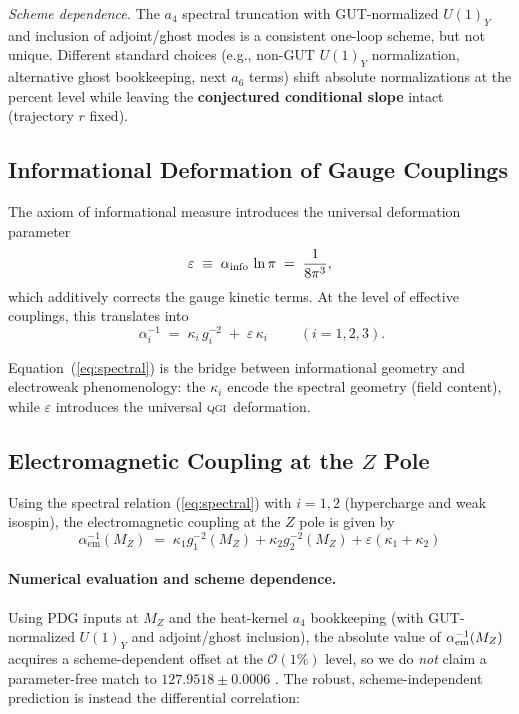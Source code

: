 \documentclass{article}
\numberwithin{equation}{section}
\theoremstyle{plain}
\theoremstyle{definition}
\theoremstyle{remark}
\newcommand{\qgi}{\textsc{qgi}}
\begin{document}
\emph{Scheme dependence.} The $a_4$ spectral truncation with GUT-normalized $U(1)_Y$ and inclusion of adjoint/ghost modes is a consistent one-loop scheme, but not unique. Different standard choices (e.g., non-GUT $U(1)_Y$ normalization, alternative ghost bookkeeping, next $a_6$ terms) shift absolute normalizations at the percent level while leaving the \textbf{conjectured conditional slope} intact (trajectory $r$ fixed).
\normalsize
\subsection{Informational Deformation of Gauge Couplings}
\label{subsec:info_deform}

The axiom of informational measure introduces the universal deformation parameter
\begin{equation}
\varepsilon \;\equiv\; \alpha_{\rm info}\,\ln\pi \;=\; \frac{1}{8\pi^3},
\label{eq:epsdef}
\end{equation}
which additively corrects the gauge kinetic terms. At the level of effective couplings, this translates into
\begin{equation}
\boxed{\;
\alpha_i^{-1} \;=\; \kappa_i\,g_i^{-2} \;+\; \varepsilon\,\kappa_i
\;} \qquad (i=1,2,3).
\label{eq:spectral}
\end{equation}

Equation~(\ref{eq:spectral}) is the bridge between informational geometry and electroweak phenomenology: the $\kappa_i$ encode the spectral geometry (field content), while $\varepsilon$ introduces the universal \qgi\ deformation.

\subsection{Electromagnetic Coupling at the $Z$ Pole}
\label{subsec:alpha_em}

Using the spectral relation (\ref{eq:spectral}) with $i=1,2$ (hypercharge and weak isospin), the electromagnetic coupling at the $Z$ pole is given by
\begin{equation}
\boxed{\;
\alpha_{\text{em}}^{-1}(M_Z) \;=\; \kappa_1 g_1^{-2}(M_Z) + \kappa_2 g_2^{-2}(M_Z) + \varepsilon(\kappa_1+\kappa_2)
\;}
\label{eq:alphaemfromspectral}
\end{equation}

\paragraph{Numerical evaluation and scheme dependence.}
Using PDG inputs at $M_Z$ and the heat-kernel $a_4$ bookkeeping (with GUT-normalized $U(1)_Y$ and adjoint/ghost inclusion), the absolute value of $\alpha_{\rm em}^{-1}(M_Z)$ acquires a scheme-dependent offset at the $\mathcal{O}(1\%)$ level, so we do \emph{not} claim a parameter-free match to $127.9518\pm 0.0006$ \cite{PDG2024}. The robust, scheme-independent prediction is instead the differential correlation:
\end{document}
